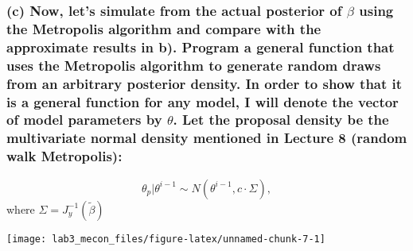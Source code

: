 \documentclass[]{article}
\begin{document}
\hypertarget{c-now-lets-simulate-from-the-actual-posterior-of-beta-using-the-metropolis-algorithm-and-compare-with-the-approximate-results-in-b.-program-a-general-function-that-uses-the-metropolis-algorithm-to-generate-random-draws-from-an-arbitrary-posterior-density.-in-order-to-show-that-it-is-a-general-function-for-any-model-i-will-denote-the-vector-of-model-parameters-by-theta.-let-the-proposal-density-be-the-multivariate-normal-density-mentioned-in-lecture-8-random-walk-metropolis}{%
\subsubsection{\texorpdfstring{(c) Now, let's simulate from the actual
posterior of \(\beta\) using the Metropolis algorithm and compare with
the approximate results in b). Program a general function that uses the
Metropolis algorithm to generate random draws from an arbitrary
posterior density. In order to show that it is a general function for
any model, I will denote the vector of model parameters by \(\theta\).
Let the proposal density be the multivariate normal density mentioned in
Lecture 8 (random walk
Metropolis):}{(c) Now, let's simulate from the actual posterior of \textbackslash beta using the Metropolis algorithm and compare with the approximate results in b). Program a general function that uses the Metropolis algorithm to generate random draws from an arbitrary posterior density. In order to show that it is a general function for any model, I will denote the vector of model parameters by \textbackslash theta. Let the proposal density be the multivariate normal density mentioned in Lecture 8 (random walk Metropolis):}}\label{c-now-lets-simulate-from-the-actual-posterior-of-beta-using-the-metropolis-algorithm-and-compare-with-the-approximate-results-in-b.-program-a-general-function-that-uses-the-metropolis-algorithm-to-generate-random-draws-from-an-arbitrary-posterior-density.-in-order-to-show-that-it-is-a-general-function-for-any-model-i-will-denote-the-vector-of-model-parameters-by-theta.-let-the-proposal-density-be-the-multivariate-normal-density-mentioned-in-lecture-8-random-walk-metropolis}}

\[\theta_p | \theta^{i−1} \sim N(\theta^{i−1}, c \cdot \Sigma) ,\] where
\(\Sigma = J^{-1}_y(\tilde{\beta})\)

\begin{center}\texttt{[image: lab3\_mecon\_files/figure-latex/unnamed-chunk-7-1]} \end{center}
\end{document}
